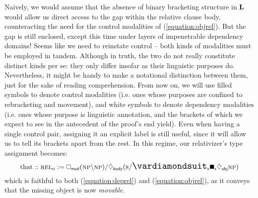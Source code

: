 Naively, we would assume that the absence of binary bracketing structure in $\textbf{L}$ would allow us direct access to the gap within the relative clause body, counteracting the need for the control modalities of (\ref{equation:objrel}).
But the gap is still enclosed, except this time under layers of impenetrable dependency domains!
Seems like we need to reinstate control -- both kinds of modalities must be employed in tandem.
Although in truth, the two do not really constitute distinct kinds per se: they only differ insofar as their linguistic purposes do.
Nevertheless, it might be handy to make a notational distinction between them, just for the sake of reading comprehension.
From now on, we will use filled symbols to denote control modalities (i.e. ones whose purposes are confined to rebracketing and movement), and white symbols to denote dependency modalities (i.e. ones whose purpose is linguistic annotation, and the brackets of which we expect to see in the antecedent of the proof's end yield).
Even when having a single control pair, assigning it an explicit label  is still useful, since it will allow us to tell its brackets apart from the rest.
In this regime, our relativizer's type assignment becomes:
\begin{equation}
\text{that} :: \subcat{l}{rel}{o} := \dbox{mod}(\np\divleft\np)\divright\ddia{body}(\s\divright\dxdia{x}\dxbox{x}\ddia{obj}\np)
\end{equation}
which is faithful to both (\ref{equation:deprel}) and (\ref{equation:objrel}), as it conveys that the missing object is now \textit{movable}.


